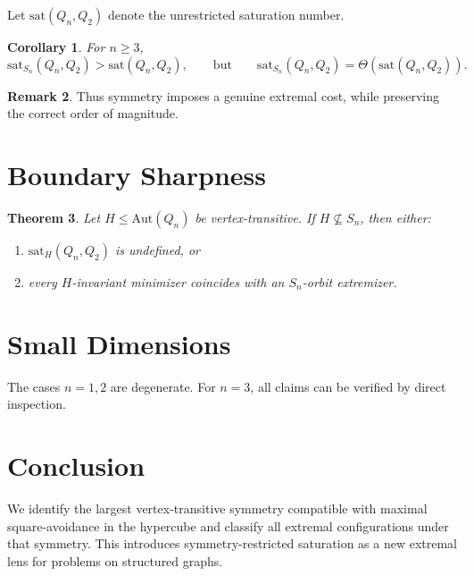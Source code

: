 \documentclass[11pt]{article}
\theoremstyle{plain}
\newtheorem{theorem}{Theorem}[section]
\newtheorem{corollary}[theorem]{Corollary}
\theoremstyle{definition}
\newtheorem{remark}[theorem]{Remark}
\newcommand{\Qn}{Q_n}
\newcommand{\Aut}{\mathrm{Aut}}
\begin{document}
Let $\mathrm{sat}(\Qn,Q_2)$ denote the unrestricted saturation number.

\begin{corollary}
For $n\ge3$,
\[
\mathrm{sat}_{S_n}(\Qn,Q_2)
>
\mathrm{sat}(\Qn,Q_2),
\qquad
\text{but}\qquad
\mathrm{sat}_{S_n}(\Qn,Q_2)
=
\Theta(\mathrm{sat}(\Qn,Q_2)).
\]
\end{corollary}

\begin{remark}
Thus symmetry imposes a genuine extremal cost, while preserving the correct order of magnitude.
\end{remark}

\section{Boundary Sharpness}

\begin{theorem}
Let $H\le\Aut(\Qn)$ be vertex-transitive.
If $H\not\subseteq S_n$, then either:
\begin{enumerate}[label=(\roman*)]
\item $\mathrm{sat}_H(\Qn,Q_2)$ is undefined, or
\item every $H$-invariant minimizer coincides with an $S_n$-orbit extremizer.
\end{enumerate}
\end{theorem}

\section{Small Dimensions}

The cases $n=1,2$ are degenerate.  
For $n=3$, all claims can be verified by direct inspection.

\section{Conclusion}

We identify the largest vertex-transitive symmetry compatible with maximal square-avoidance in the hypercube and classify all extremal configurations under that symmetry.  
This introduces symmetry-restricted saturation as a new extremal lens for problems on structured graphs.
\end{document}

